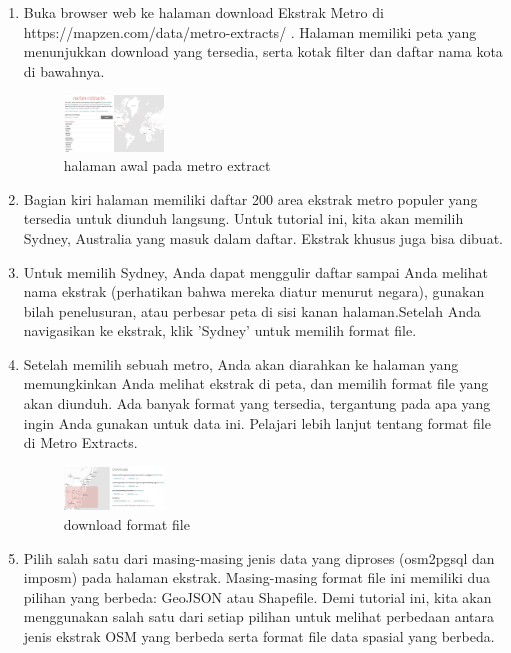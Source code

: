 \begin{enumerate}
\item
Buka browser web ke halaman download Ekstrak Metro di https://mapzen.com/data/metro-extracts/ . Halaman memiliki peta yang menunjukkan download yang tersedia, serta kotak filter dan daftar nama kota di bawahnya.

\begin{figure}[ht]
\centerline{\includegraphics[width=0.25\textwidth]{figures/halamanawal}}
\caption{halaman awal pada metro extract}
\label {halamanawal}
\end{figure}

\item 
Bagian kiri halaman memiliki daftar 200 area ekstrak metro populer yang tersedia untuk diunduh langsung. Untuk tutorial ini, kita akan memilih Sydney, Australia yang masuk dalam daftar. Ekstrak khusus juga bisa dibuat.
\item
Untuk memilih Sydney, Anda dapat menggulir daftar sampai Anda melihat nama ekstrak (perhatikan bahwa mereka diatur menurut negara), gunakan bilah penelusuran, atau perbesar peta di sisi kanan halaman.Setelah Anda navigasikan ke ekstrak, klik 'Sydney' untuk memilih format file.
\item
Setelah memilih sebuah metro, Anda akan diarahkan ke halaman yang memungkinkan Anda melihat ekstrak di peta, dan memilih format file yang akan diunduh. Ada banyak format yang tersedia, tergantung pada apa yang ingin Anda gunakan untuk data ini. Pelajari lebih lanjut tentang format file di Metro Extracts.

\begin{figure}[ht]
\centerline{\includegraphics[width=0.25\textwidth]{figures/formatfile}}
\caption{download format file}
\label {formatfile}
\end{figure}


\item
Pilih salah satu dari masing-masing jenis data yang diproses (osm2pgsql dan imposm) pada halaman ekstrak. Masing-masing format file ini memiliki dua pilihan yang berbeda: GeoJSON atau Shapefile. Demi tutorial ini, kita akan menggunakan salah satu dari setiap pilihan untuk melihat perbedaan antara jenis ekstrak OSM yang berbeda serta format file data spasial yang berbeda.

\end{enumerate}

